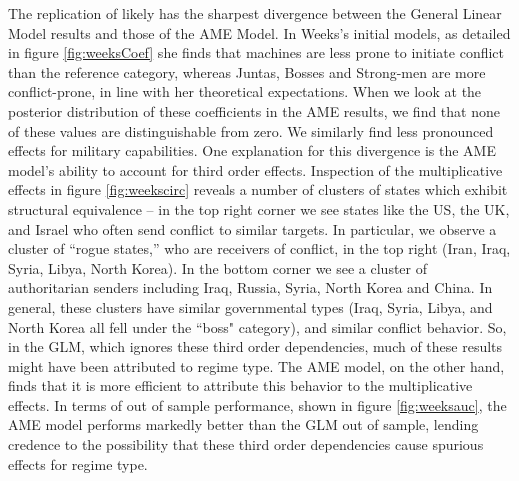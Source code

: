 \documentclass[12pt]{amsart}
\begin{document}
The replication of \citet{weeks:2012} likely has the sharpest divergence between the General Linear Model results and those of the AME Model. In Weeks's initial models, as detailed in figure \ref{fig:weeksCoef} she finds that machines are less prone to initiate conflict than the reference category, whereas Juntas, Bosses and Strong-men are more conflict-prone, in line with her theoretical expectations. When we look at the posterior distribution of these coefficients in the AME results, we find that none of these values are distinguishable from zero. We similarly find less pronounced effects for military capabilities. One explanation for this divergence is the AME model's ability to account for third order effects. Inspection of the multiplicative effects in figure \ref{fig:weekscirc} reveals a number of clusters of states which exhibit structural equivalence -- in the top right corner we see states like the US, the UK, and Israel who often send conflict to similar targets. In particular, we observe a cluster of ``rogue states,'' who are receivers of conflict, in the top right (Iran, Iraq, Syria, Libya, North Korea). In the bottom corner we see a cluster of authoritarian senders including Iraq, Russia, Syria, North Korea and China. In general, these clusters have similar governmental types (Iraq, Syria, Libya, and North Korea all fell under the ``boss" category), and similar conflict behavior. So, in the GLM, which ignores these third order dependencies, much of these results might have been attributed to regime type. The AME model, on the other hand, finds that it is more efficient to attribute this behavior to the multiplicative effects. In terms of out of sample performance, shown in figure \ref{fig:weeksauc}, the AME model performs markedly better than the GLM out of sample, lending credence to the possibility that these third order dependencies cause spurious effects for regime type.
\end{document}
